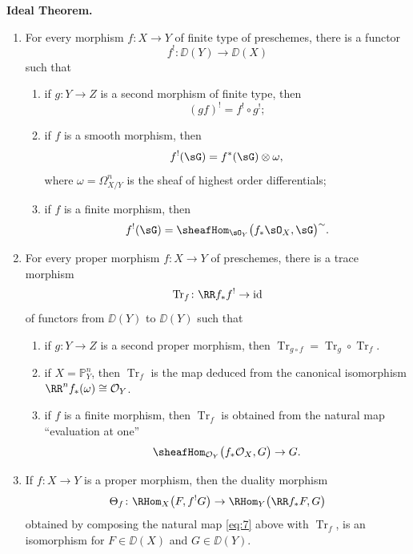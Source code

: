 \filbreak
\bigskip
\noindent
\textbf{Ideal Theorem.}
\begin{enumerate}
	\item[(a)] For every morphism $f\colon X\to Y$ of finite type of preschemes, there is a functor
	\[
	f^{!}\colon \DD(Y)\longrightarrow\DD(X)
	\]
	such that
	\begin{enumerate}
		\item[1)] if $g\colon Y\to Z$ is a second morphism of finite type, then
		\[
		(gf)^{!}=f^{!}\circ g^{!};
		\]
		\item[2)] if $f$ is a smooth morphism, then
		\[
		f^{!}(\sG)=f^{*}(\sG)\otimes\omega,
		\]
		where $\omega=\Omega_{X/Y}^{n}$ is the sheaf of highest order differentials;
		\item[3)] if $f$ is a finite morphism, then
		\[
		f^{!}(\sG)=\sheafHom_{\sO_{Y}}\bigl(f_{*}\sO_{X},\sG\bigr)^{\sim}.
		\]
	\end{enumerate}

\item[(b)] For every proper morphism $f\colon X\to Y$ of preschemes, there is a trace morphism
\[
\operatorname{Tr}_{f}\colon \RR f_{*}f^{!}\to\operatorname{id}
\]
of functors from $\DD(Y)$ to $\DD(Y)$ such that
\begin{enumerate}
	\item[1)] if $g\colon Y\to Z$ is a second proper morphism, then $\operatorname{Tr}_{g\circ f}=\operatorname{Tr}_{g}\circ\operatorname{Tr}_{f}$.
	\item[2)] if $X=\mathbb{P}_{Y}^{n}$, then $\operatorname{Tr}_{f}$ is the map deduced from the canonical isomorphism $\RR^{n}f_{*}(\omega)\cong\mathcal{O}_{Y}$.
	\item[3)] if $f$ is a finite morphism, then $\operatorname{Tr}_{f}$ is obtained from the natural map ``evaluation at one''
	\[
	\sheafHom_{\mathcal{O}_Y}\bigl(f_{*}\mathcal{O}_{X},G\bigr)\to G.
	\]
\end{enumerate}

\smallskip
\item[(c)] If $f\colon X\to Y$ is a proper morphism, then the duality morphism
\[
\Theta_{f}\colon \RHom_{X}\bigl(F,f^{!}G\bigr)\to \RHom_{Y}\bigl(\RR f_{*}F,G\bigr)
\]
obtained by composing the natural map \eqref{eq:7} above with $\operatorname{Tr}_{f}$, is an isomorphism for $F\in \DD(X)$ and $G\in \DD(Y)$.

\bigskip
	
\end{enumerate}


